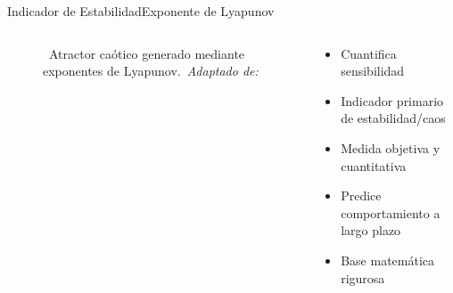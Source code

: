 \begin{frame}{Indicador de Estabilidad}{Exponente de Lyapunov}
    \begin{columns}
        \begin{column}{0.4\textwidth}
            \centering
            \begin{figure}[H]
                \centering
                \vspace{-0.25cm}
                \caption{\tiny~Atractor caótico generado mediante exponentes de Lyapunov.~\textit{Adaptado de:}~\cite{bourke_lyapunov_attractors_2001}}%
                \label{fig:Lyapunov_diagram}
            \end{figure}
        \end{column}
        \begin{column}{0.6\textwidth}
            \begin{itemize}
                \item Cuantifica sensibilidad
                \item Indicador primario de estabilidad/caos
                \item Medida objetiva y cuantitativa
                \item Predice comportamiento a largo plazo
                \item Base matemática rigurosa
            \end{itemize}
        \end{column}
    \end{columns}
\end{frame}

